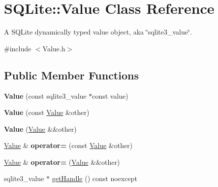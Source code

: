 \hypertarget{class_s_q_lite_1_1_value}{\section{S\-Q\-Lite\-:\-:Value Class Reference}
\label{class_s_q_lite_1_1_value}
}


A S\-Q\-Lite dynamically typed value object, aka \char`\"{}sqlite3\-\_\-value\char`\"{}.  




{\ttfamily \#include $<$Value.\-h$>$}

\subsection*{Public Member Functions}
\begin{DoxyCompactItemize}
\item 
\hypertarget{class_s_q_lite_1_1_value_ace0be7092c23d5e3f4312db057d86997}{{\bfseries Value} (const sqlite3\-\_\-value $\ast$const value)}\label{class_s_q_lite_1_1_value_ace0be7092c23d5e3f4312db057d86997}

\item 
\hypertarget{class_s_q_lite_1_1_value_acd6e10f2a509c8a0be20237d4b3a0fc7}{{\bfseries Value} (const \hyperlink{class_s_q_lite_1_1_value}{Value} \&other)}\label{class_s_q_lite_1_1_value_acd6e10f2a509c8a0be20237d4b3a0fc7}

\item 
\hypertarget{class_s_q_lite_1_1_value_a531d4f514b9abe1eb1f47a277737b953}{{\bfseries Value} (\hyperlink{class_s_q_lite_1_1_value}{Value} \&\&other)}\label{class_s_q_lite_1_1_value_a531d4f514b9abe1eb1f47a277737b953}

\item 
\hypertarget{class_s_q_lite_1_1_value_a879c07032f32606d277a8f6581a13abf}{\hyperlink{class_s_q_lite_1_1_value}{Value} \& {\bfseries operator=} (const \hyperlink{class_s_q_lite_1_1_value}{Value} \&other)}\label{class_s_q_lite_1_1_value_a879c07032f32606d277a8f6581a13abf}

\item 
\hypertarget{class_s_q_lite_1_1_value_ab80d7cf9eb8a462b23459d0fbba80277}{\hyperlink{class_s_q_lite_1_1_value}{Value} \& {\bfseries operator=} (\hyperlink{class_s_q_lite_1_1_value}{Value} \&\&other)}\label{class_s_q_lite_1_1_value_ab80d7cf9eb8a462b23459d0fbba80277}

\item 
\hypertarget{class_s_q_lite_1_1_value_adc0c8d347cbd6dbbd38c85ff755c9100}{sqlite3\-\_\-value $\ast$ \hyperlink{class_s_q_lite_1_1_value_adc0c8d347cbd6dbbd38c85ff755c9100}{get\-Handle} () const noexcept}\label{class_s_q_lite_1_1_value_adc0c8d347cbd6dbbd38c85ff755c9100}


\end{DoxyCompactItemize}
